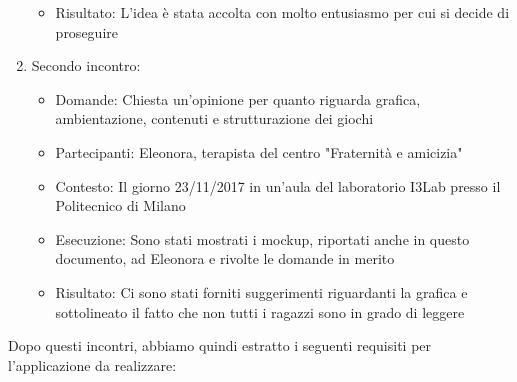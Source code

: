 \begin{enumerate}
\begin{itemize}
		\item Risultato: L'idea è stata accolta con molto entusiasmo per cui si decide di proseguire  
		\end{itemize}
\item Secondo incontro:
		\begin{itemize}
		\item Domande:  Chiesta un'opinione per quanto riguarda grafica, ambientazione, contenuti e 								strutturazione dei giochi
		\item Partecipanti: Eleonora, terapista del centro "Fraternità e amicizia"
		\item Contesto: Il giorno 23/11/2017 in un'aula del laboratorio I3Lab presso il Politecnico di 								Milano
		\item Esecuzione: Sono stati mostrati i mockup, riportati anche in questo documento, ad Eleonora e 						  rivolte le domande in merito
		\item Risultato: Ci sono stati forniti suggerimenti riguardanti la grafica e sottolineato il fatto 						 che non tutti i ragazzi sono in grado di leggere   
		\end{itemize}
\end{enumerate}
 Dopo questi incontri, abbiamo quindi estratto i seguenti requisiti per l'applicazione da realizzare:
